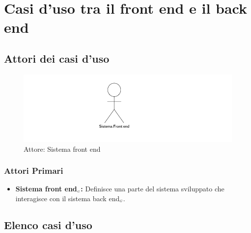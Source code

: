 \section{Casi d'uso tra il front end e il back end}\label{CasiDUsoCasiDUsoTraIlFrontEndEIlBackEnd}

\subsection{Attori dei casi d'uso}\label{CasiDUsoCasiDUsoTraIlFrontEndEIlBackEndAttoriDeiCasiDUso}
\begin{center}
	\begin{figure}[H]
		\centering\includegraphics{../immagini/attori_casi/sistema_front_end.png}
		\caption{Attore: Sistema front end}
	\end{figure}
\end{center}
\subsubsection{Attori Primari}\label{CasiDUsoCasiDUsoTraIlFrontEndEIlBackEndAttoriDeiCasiDUsoAttoriPrimari}
\begin{itemize}
	\item \textbf{Sistema front end$_{\scaleto{G}{3pt}}$:} Definisce una parte del sistema sviluppato che interagisce con il sistema back end$_{\scaleto{G}{3pt}}$.
\end{itemize}

\subsection{Elenco casi d'uso}\label{CasiDUsoCasiDUsoTraIlFrontEndEIlBackEndElencoDeiCasiDUso}

